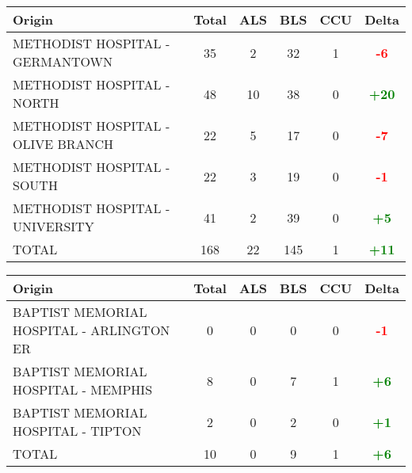 \documentclass{article}
\begin{document}
\begin{longtable}{l|cccc|c}
    \toprule
    Origin & Total & ALS & BLS & CCU & Delta \\
    \midrule
    
        
            METHODIST HOSPITAL - GERMANTOWN & 35 & 2 & 32 & 1 & \textcolor{red}{\textbf{-6}} \\
        
    
        
            METHODIST HOSPITAL - NORTH & 48 & 10 & 38 & 0 & \textcolor{green}{\textbf{+20}} \\
        
    
        
            METHODIST HOSPITAL - OLIVE BRANCH & 22 & 5 & 17 & 0 & \textcolor{red}{\textbf{-7}} \\
        
    
        
            METHODIST HOSPITAL - SOUTH & 22 & 3 & 19 & 0 & \textcolor{red}{\textbf{-1}} \\
        
    
        
            METHODIST HOSPITAL - UNIVERSITY & 41 & 2 & 39 & 0 & \textcolor{green}{\textbf{+5}} \\
        
    
        
            \hline
        
    
        
            TOTAL & 168 & 22 & 145 & 1 & \textcolor{green}{\textbf{+11}} \\
        
    
    \bottomrule
\end{longtable}

\begin{longtable}{l|cccc|c}
    \toprule
    Origin & Total & ALS & BLS & CCU & Delta \\
    \midrule
    
        
            BAPTIST MEMORIAL HOSPITAL -  ARLINGTON ER & 0 & 0 & 0 & 0 & \textcolor{red}{\textbf{-1}} \\
        
    
        
            BAPTIST MEMORIAL HOSPITAL - MEMPHIS & 8 & 0 & 7 & 1 & \textcolor{green}{\textbf{+6}} \\
        
    
        
            BAPTIST MEMORIAL HOSPITAL - TIPTON & 2 & 0 & 2 & 0 & \textcolor{green}{\textbf{+1}} \\
        
    
        
            \hline
        
    
        
            TOTAL & 10 & 0 & 9 & 1 & \textcolor{green}{\textbf{+6}} \\
        
    
    \bottomrule
\end{longtable}
\end{document}
